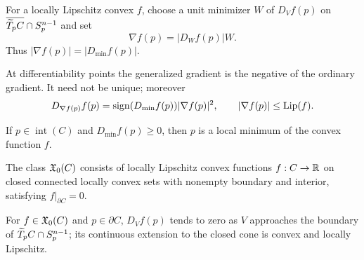 \begin{definition}
\label{def:chow-iii-h29-generalized-gradient}
For a locally Lipschitz convex $f$, choose a unit minimizer $W$ of $D_Vf(p)$ on
$\overline{\widetilde T_pC}\cap S_p^{n-1}$ and set
\[
\nabla f(p)=|D_Wf(p)|W.
\]
Thus $|\nabla f(p)|=|D_{\min}f(p)|$.
\end{definition}

\begin{lemma}
\label{lem:chow-iii-h30-generalized-gradient-properties}
At differentiability points the generalized gradient is the negative of the ordinary
gradient.  It need not be unique; moreover
\[
D_{\nabla f(p)}f(p)=\operatorname{sign}(D_{\min}f(p))|\nabla f(p)|^2,
\qquad |\nabla f(p)|\le\operatorname{Lip}(f).
\]
\end{lemma}

\begin{lemma}
\label{lem:chow-iii-h31-critical-local-minimum}
If $p\in\operatorname{int}(C)$ and $D_{\min}f(p)\ge0$, then $p$ is a local minimum
of the convex function $f$.
\end{lemma}

\begin{definition}
\label{def:chow-iii-h32-Xzero}
The class $\mathfrak X_0(C)$ consists of locally Lipschitz convex functions $f:C\to\mathbb R$ on
closed connected locally convex sets with nonempty boundary and interior, satisfying
$f|_{\partial C}=0$.
\end{definition}

\begin{lemma}
\label{lem:chow-iii-h33-boundary-directional-extension}
For $f\in\mathfrak X_0(C)$ and $p\in\partial C$, $D_Vf(p)$ tends to zero as $V$ approaches
the boundary of $\widetilde T_pC\cap S_p^{n-1}$; its continuous extension to the closed cone is
convex and locally Lipschitz.
\end{lemma}

